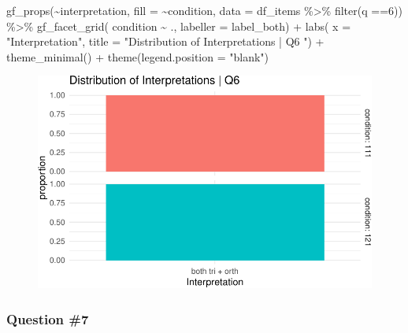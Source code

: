 \documentclass[
  letterpaper,
  DIV=11,
  numbers=noendperiod]{scrreprt}
\newenvironment{Shaded}{\begin{snugshade}}{\end{snugshade}}
\newcommand{\AttributeTok}[1]{\textcolor[rgb]{0.40,0.45,0.13}{#1}}
\newcommand{\DecValTok}[1]{\textcolor[rgb]{0.68,0.00,0.00}{#1}}
\newcommand{\FunctionTok}[1]{\textcolor[rgb]{0.28,0.35,0.67}{#1}}
\newcommand{\NormalTok}[1]{\textcolor[rgb]{0.00,0.23,0.31}{#1}}
\newcommand{\SpecialCharTok}[1]{\textcolor[rgb]{0.37,0.37,0.37}{#1}}
\newcommand{\StringTok}[1]{\textcolor[rgb]{0.13,0.47,0.30}{#1}}
\begin{document}
\begin{Shaded}
\begin{Highlighting}[]
\FunctionTok{gf\_props}\NormalTok{(}\SpecialCharTok{\textasciitilde{}}\NormalTok{interpretation, }\AttributeTok{fill =} \SpecialCharTok{\textasciitilde{}}\NormalTok{condition, }\AttributeTok{data =}\NormalTok{ df\_items }\SpecialCharTok{\%\textgreater{}\%} \FunctionTok{filter}\NormalTok{(q }\SpecialCharTok{==}\DecValTok{6}\NormalTok{)) }\SpecialCharTok{\%\textgreater{}\%} 
  \FunctionTok{gf\_facet\_grid}\NormalTok{( condition }\SpecialCharTok{\textasciitilde{}}\NormalTok{ ., }\AttributeTok{labeller =}\NormalTok{ label\_both) }\SpecialCharTok{+} 
  \FunctionTok{labs}\NormalTok{( }\AttributeTok{x =} \StringTok{"Interpretation"}\NormalTok{, }\AttributeTok{title =} \StringTok{"Distribution of Interpretations | Q6 "}\NormalTok{) }\SpecialCharTok{+} 
  \FunctionTok{theme\_minimal}\NormalTok{() }\SpecialCharTok{+} \FunctionTok{theme}\NormalTok{(}\AttributeTok{legend.position =} \StringTok{"blank"}\NormalTok{)}
\end{Highlighting}
\end{Shaded}

\begin{figure}[H]

{\centering \includegraphics{analysis/SGC3A/2_sgc3A_scoring_files/figure-pdf/Q6-distribution-2.pdf}

}

\end{figure}

\hypertarget{question-7}{%
\subsubsection{Question \#7}\label{question-7}}
\end{document}
